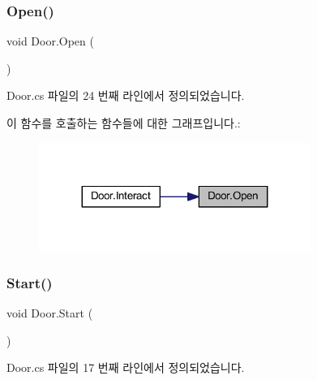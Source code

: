 \subsubsection{\texorpdfstring{Open()}{Open()}}
{\footnotesize\ttfamily void Door.\+Open (\begin{DoxyParamCaption}{ }\end{DoxyParamCaption})}



Door.\+cs 파일의 24 번째 라인에서 정의되었습니다.


\begin{DoxyCode}{0}

\end{DoxyCode}
이 함수를 호출하는 함수들에 대한 그래프입니다.\+:\nopagebreak
\begin{figure}[H]
\begin{center}
\leavevmode
\includegraphics[width=251pt]{da/d30/class_door_a79629ef728511bbce03ebd1a3a133581_icgraph}
\end{center}
\end{figure}
\mbox{\label{class_door_a67f37254b23f6f8770549a7e5a51f15b}} 
\subsubsection{\texorpdfstring{Start()}{Start()}}
{\footnotesize\ttfamily void Door.\+Start (\begin{DoxyParamCaption}{ }\end{DoxyParamCaption})\hspace{0.3cm}{\ttfamily [private]}}



Door.\+cs 파일의 17 번째 라인에서 정의되었습니다.


